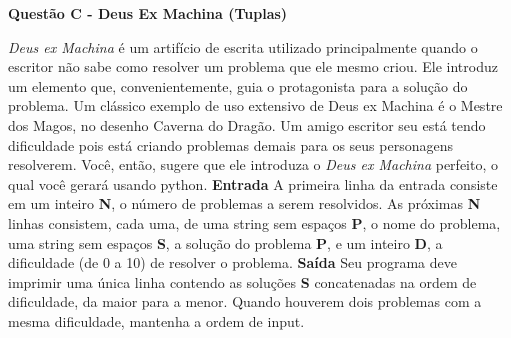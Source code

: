 \documentclass[a4paper, 12pt]{article}
\begin{document}
\newpage %
\begin{center}
\textbf{{\Large Questão C - Deus Ex Machina (Tuplas)}}
\end{center}
\vspace{5pt}
\textit{Deus ex Machina} é um artifício de escrita utilizado principalmente quando o
escritor não sabe como resolver um problema que ele mesmo criou. Ele
introduz um elemento que, convenientemente, guia o protagonista para a
solução do problema. Um clássico exemplo de uso extensivo de Deus ex
Machina é o Mestre dos Magos, no desenho Caverna do Dragão. \newline \newline
Um amigo escritor seu está tendo dificuldade pois está criando problemas
demais para os seus personagens resolverem. Você, então, sugere que ele
introduza o \textit{Deus ex Machina} perfeito, o qual você gerará usando python.
\newline \newline
\textbf{{\large Entrada}} \newline 
A primeira linha da entrada consiste em um inteiro \textbf{N}, o número de problemas
a serem resolvidos. \newline
As próximas \textbf{N} linhas consistem, cada uma, de uma string sem espaços \textbf{P}, o
nome do problema, uma string sem espaços \textbf{S}, a solução do problema \textbf{P}, e
um inteiro \textbf{D}, a dificuldade (de 0 a 10) de resolver o problema.
\newline \newline
\textbf{{\large Saída}} \newline
Seu programa deve imprimir uma única linha contendo as soluções \textbf{S}
concatenadas na ordem de dificuldade, da maior para a menor. Quando
houverem dois problemas com a mesma dificuldade, mantenha a ordem de
input.
\newline
\end{document}
